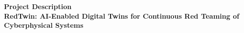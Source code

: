 \documentclass[11pt,letterpaper]{article}
\newcommand{\sysname}{RedTwin\xspace}
\begin{document}


\clearpage

\setcounter{page}{1}

\begin{center}
  {\large\bfseries Project Description}\\[0.3em]
  {\large\bfseries \sysname: AI-Enabled Digital Twins for Continuous Red Teaming of Cyberphysical Systems}
\end{center}









\end{document}
